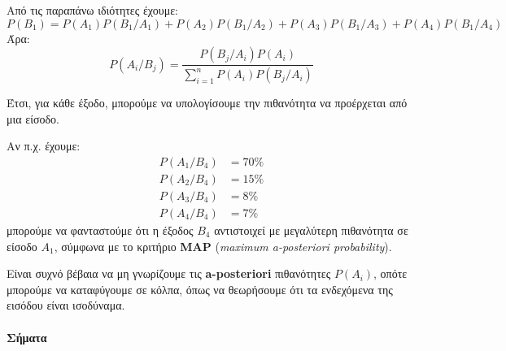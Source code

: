 \documentclass[11pt,a4paper,notitlepage,fleqn,final]{article}
\begin{document}
	Από τις παραπάνω ιδιότητες έχουμε:
	\[
	P(B_1) = P(A_1)P(B_1/A_1)
	+P(A_2)P(B_1/A_2)
	+P(A_3)P(B_1/A_3)
	+P(A_4)P(B_1/A_4)
	\]
	Άρα:
	\[
		P(A_i/B_j) = \frac{P(B_j/A_i)P(A_i)}{
			\sum_{i=1}^n P(A_i)P(B_j/A_i)
			}
	\]
	
	Έτσι, για κάθε έξοδο, μπορούμε να υπολογίσουμε την πιθανότητα
	να προέρχεται από μια είσοδο.
	
	Αν π.χ. έχουμε: \begin{align*}
		P(A_1/B_4) &= 70\% \\
		P(A_2/B_4) &= 15\% \\
		P(A_3/B_4) &= 8\% \\
		P(A_4/B_4) &= 7\%
	\end{align*}
	μπορούμε να φανταστούμε ότι η έξοδος \( B_4 \) αντιστοιχεί με
	μεγαλύτερη πιθανότητα σε είσοδο \( A_1 \), σύμφωνα με το κριτήριο
	\textbf{MAP} (\textit{maximum a-posteriori probability}).
	
	Είναι συχνό βέβαια να μη γνωρίζουμε τις \textbf{a-posteriori}
	πιθανότητες \( P(A_i) \), οπότε μπορούμε να καταφύγουμε σε κόλπα,
	όπως να θεωρήσουμε ότι τα ενδεχόμενα της εισόδου είναι ισοδύναμα.
	
	\paragraph{Σήματα}
	\hspace{0pt}
	
\end{document}
